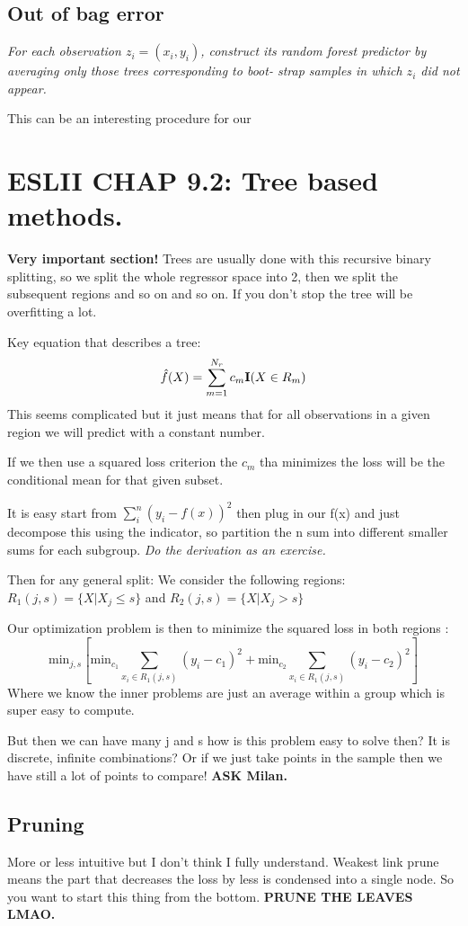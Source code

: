 \documentclass{article}
\begin{document}
\subsection*{Out of bag error}
\textit{For each observation $z_i = (x_i, y_i)$, construct its random forest
predictor by averaging only those trees corresponding to boot-
strap samples in which $z_i$ did not appear.}

This can be an interesting procedure for our 

\section*{ESLII CHAP 9.2: Tree based methods.}
\textbf{Very important section!}
Trees are usually done with this recursive binary splitting, so we split the whole regressor space into 2, then we split the subsequent regions and so on and so on. If you don't stop the tree will be overfitting a lot.

Key equation that describes a tree: 
$$\hat{f}(X) = \sum_{m=1}^{N_r} c_m \textrm{\textbf{I}}(X \in R_m)$$
This seems complicated but it just means that for all observations in a given region we will predict with a constant number.

If we then use a squared loss criterion the $c_m$ tha minimizes the loss will be the conditional mean for that given subset.

It is easy start from $\sum_i^n(y_i -f(x))^2$ then plug in our f(x) and just decompose this using the indicator, so partition the n sum into different smaller sums for each subgroup.
\textit{Do the derivation as an exercise.}

Then for any general split:
We consider the following regions: $R_1(j,s) = \{ X| X_j \leq s \}$ and $R_2(j,s) = \{ X| X_j > s \}$

Our optimization problem is then to minimize the squared loss in both regions : 
$$ \textrm{min}_{j,s}[\textrm{min}_{c_1} \sum_{x_i \in R_1(j,s)}(y_i-c_1)^2 + \textrm{min}_{c_2} \sum_{x_i \in R_1(j,s)}(y_i-c_2)^2  ]$$
Where we know the inner problems are just an average within a group which is super easy to compute.

But then we can have many j and s how is this problem easy to solve then? It is discrete, infinite combinations? Or if we just take points in the sample then we have still a lot of points to compare! \textbf{ASK Milan.}

\subsection*{Pruning}
More or less intuitive but I don't think I fully understand. Weakest link prune means the part that decreases the loss by less is condensed into a single node. So you want to start this thing from the bottom. \textbf{PRUNE THE LEAVES LMAO.}
\end{document}
